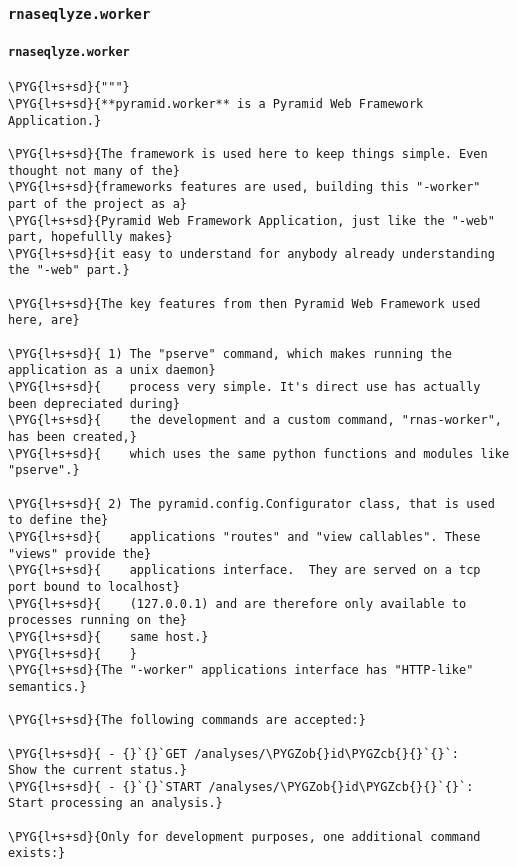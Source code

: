 \subsubsection{\texttt{rnaseqlyze.worker}}
\label{index-pdf4:rnaseqlyze-worker}

\paragraph{\texttt{rnaseqlyze.worker}}
\label{index-pdf4:id5}
\begin{Verbatim}[commandchars=\\\{\}]
\PYG{l+s+sd}{"""}
\PYG{l+s+sd}{**pyramid.worker** is a Pyramid Web Framework Application.}

\PYG{l+s+sd}{The framework is used here to keep things simple. Even thought not many of the}
\PYG{l+s+sd}{frameworks features are used, building this "-worker" part of the project as a}
\PYG{l+s+sd}{Pyramid Web Framework Application, just like the "-web" part, hopefullly makes}
\PYG{l+s+sd}{it easy to understand for anybody already understanding the "-web" part.}

\PYG{l+s+sd}{The key features from then Pyramid Web Framework used here, are}

\PYG{l+s+sd}{ 1) The "pserve" command, which makes running the application as a unix daemon}
\PYG{l+s+sd}{    process very simple. It's direct use has actually been depreciated during}
\PYG{l+s+sd}{    the development and a custom command, "rnas-worker", has been created,}
\PYG{l+s+sd}{    which uses the same python functions and modules like "pserve".}

\PYG{l+s+sd}{ 2) The pyramid.config.Configurator class, that is used to define the}
\PYG{l+s+sd}{    applications "routes" and "view callables". These "views" provide the}
\PYG{l+s+sd}{    applications interface.  They are served on a tcp port bound to localhost}
\PYG{l+s+sd}{    (127.0.0.1) and are therefore only available to processes running on the}
\PYG{l+s+sd}{    same host.}
\PYG{l+s+sd}{    }
\PYG{l+s+sd}{The "-worker" applications interface has "HTTP-like" semantics.}

\PYG{l+s+sd}{The following commands are accepted:}

\PYG{l+s+sd}{ - {}`{}`GET /analyses/\PYGZob{}id\PYGZcb{}{}`{}`:      Show the current status.}
\PYG{l+s+sd}{ - {}`{}`START /analyses/\PYGZob{}id\PYGZcb{}{}`{}`:    Start processing an analysis.}

\PYG{l+s+sd}{Only for development purposes, one additional command exists:}


\end{Verbatim}
